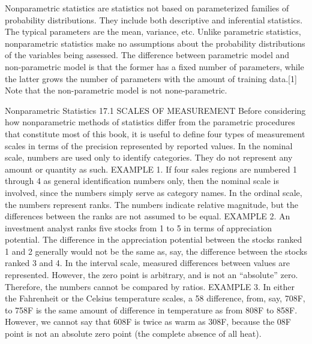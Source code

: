 Nonparametric statistics are statistics not based on parameterized families of probability distributions. 
They include both descriptive and inferential statistics. The typical parameters are the mean, variance, etc. Unlike parametric statistics, nonparametric statistics make no assumptions about the probability distributions of the variables being assessed. The difference between parametric model and non-parametric model is that the former has a fixed number of parameters, while the latter grows the number of parameters with the amount of training data.[1] Note that the non-parametric model is not none-parametric.



Nonparametric
Statistics
17.1 SCALES OF MEASUREMENT
Before considering how nonparametric methods of statistics differ from the parametric procedures that
constitute most of this book, it is useful to define four types of measurement scales in terms of the precision
represented by reported values.
In the nominal scale, numbers are used only to identify categories. They do not represent any amount or
quantity as such.
EXAMPLE 1. If four sales regions are numbered 1 through 4 as general identification numbers only, then the nominal
scale is involved, since the numbers simply serve as category names.
In the ordinal scale, the numbers represent ranks. The numbers indicate relative magnitude, but the
differences between the ranks are not assumed to be equal.
EXAMPLE 2. An investment analyst ranks five stocks from 1 to 5 in terms of appreciation potential. The difference in the
appreciation potential between the stocks ranked 1 and 2 generally would not be the same as, say, the difference between the
stocks ranked 3 and 4.
In the interval scale, measured differences between values are represented. However, the zero point is
arbitrary, and is not an “absolute” zero. Therefore, the numbers cannot be compared by ratios.
EXAMPLE 3. In either the Fahrenheit or the Celsius temperature scales, a 58 difference, from, say, 708F, to 758F is the
same amount of difference in temperature as from 808F to 858F. However, we cannot say that 608F is twice as warm as 308F,
because the 08F point is not an absolute zero point (the complete absence of all heat).

